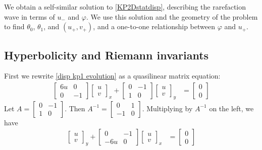 \documentclass[12pt]{article}
\numberwithin{equation}{section}
\begin{document}
We obtain a self-similar solution to \ref{KP2Dstatdisp}, describing the rarefaction wave in terms of $u_-$ and $\varphi$. We use this solution and the geometry of the problem to find $\theta_0$, $\theta_1$, and $(u_+,v_+)$, and a one-to-one relationship between $\varphi$ and $u_+$.



\subsection{Hyperbolicity and Riemann invariants}
\label{sec:hyperbolicity}
First we rewrite \eqref{disp kp1 evolution} as a quasilinear matrix equation:
\begin{align}
\left[
    \begin{array}{cc}
        6u & 0 \\
        0 & -1
    \end{array}
    \right]
    \left[\begin{array}{c}
         u  \\
         v 
    \end{array}\right]_x + \left[\begin{array}{cc}
        0 & -1 \\
        1 & 0
    \end{array}\right]
    \left[\begin{array}{c}
         u  \\
         v 
    \end{array}\right]_y
    &= 
    \left[\begin{array}{c}
         0  \\
         0 
    \end{array}\right]
\end{align}
Let $A = \left[\begin{array}{cc}
    0 & -1 \\
    1 & 0
\end{array}\right]$. Then $A^{-1} = \left[\begin{array}{cc}
    0 & 1 \\
    -1 & 0
\end{array}\right]$. Multiplying by $A^{-1}$ on the left, we have
\begin{align}
    \left[\begin{array}{c}
         u  \\
         v 
    \end{array}\right]_y + 
    \left[\begin{array}{cc}
        0 & -1 \\
        -6 u & 0
    \end{array}\right]
    \left[\begin{array}{c}
         u  \\
         v 
    \end{array}\right]_x 
    &=
    \left[\begin{array}{c}
         0  \\
         0 
    \end{array}\right]
    \label{disp matrix system}
\end{align} 
\end{document}
